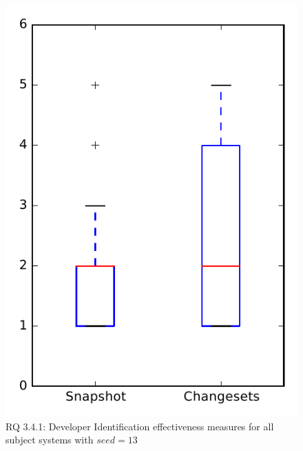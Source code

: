 
\begin{figure}
\centering
\includegraphics[height=0.4\textheight]{figures/dit_seed/rq1_overview_13}
\caption{RQ 3.4.1: Developer Identification effectiveness measures for all subject systems with $seed=13$}
\label{fig:dit_seed:rq1:overview}
\end{figure}
